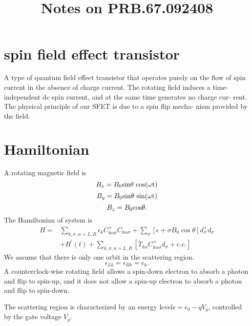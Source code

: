 \documentclass[11pt,a4paper]{article}
\begin{document}
\title{Notes on PRB.67.092408}
\date{}
\maketitle

\section{spin field effect transistor}
A type of quantum field effect transistor that operates purely on the flow of spin current in the absence of charge current. The rotating field induces a time-independent dc spin current, and at the same time generates no charge cur- rent. The physical principle of our SFET is due to a spin flip mecha- nism provided by the field.
\section{Hamiltonian}
A rotating magnetic field is
\begin{equation}
B_{x} = B_{0}\rm{sin}\theta ~\rm{cos}(\omega t)
\end{equation}
\begin{equation}
B_{y} = B_{0}\rm{sin}\theta~\rm{sin}(\omega t)
\end{equation}
\begin{equation}
B_{z} = B_{0}\rm{cos}\theta.
\end{equation}
The Hamiltonian of system is
\begin{equation}
\begin{split}
H=&\sum_{k, \sigma, \alpha=L, R} \epsilon_{k} C_{k \alpha \sigma}^{+} C_{k \alpha \sigma}+\sum_{\sigma}\left[\epsilon+\sigma B_{0} \cos \theta\right] d_{\sigma}^{+} d_{\sigma}\\
&+H^{\prime}(t)+\sum_{k, \sigma, \alpha=L, R}\left[T_{k \alpha} C_{k \alpha \sigma}^{+} d_{\sigma}+\mathrm{c.c.}\right]
\end{split}
\end{equation}
We assume that there is only one orbit in the scattering region.
\[
\epsilon_{Lk} = \epsilon_{Rk} = \epsilon_{k}.
\]
A counterclock-wise rotating field allows a spin-down electron to absorb a photon and flip to spin-up, and it does not allow a spin-up electron to absorb a photon and flip to spin-down.

The scattering region is characterized by an energy level$\epsilon = \epsilon_{0} - qV_{g}$, controlled by the gate voltage $V_{g}$.
\end{document}
